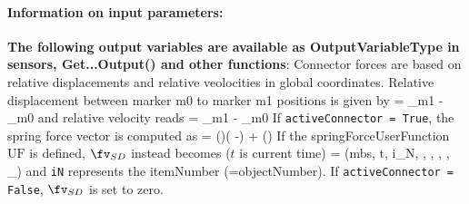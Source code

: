 \paragraph{Information on input parameters:} 
\finishTable
{\bf The following output variables are available as OutputVariableType in sensors, Get...Output() and other functions}: 
\finishTable
 \noindent
    \finishTable
    Connector forces are based on relative displacements and relative veolocities in global coordinates.
    Relative displacement between marker m0 to marker m1 positions is given by
    \be \label{eq_ObjectCartesianSpringDamper_deltaPos}
      \Delta\! = _{m1} - _{m0} \eqComma
    \ee
    and relative velocity reads
    \be
      \Delta\! = _{m1} - _{m0} \eqDot
    \ee
    If \texttt{activeConnector = True}, the spring force vector is computed as
    \be
       = \diag(\kv)\cdot(\Delta\! -) + \diag(\dv) \cdot \Delta\!  \eqDot
    \ee
    If the springForceUserFunction $\mathrm{UF}$ is defined, $\fv_{SD}$ instead becomes ($t$ is current time)
    \be
       = (mbs, t, i_N, \Delta\! , \Delta\! , \kv, \dv, \vv_{}) \eqComma
    \ee
    and \texttt{iN} represents the itemNumber (=objectNumber).
    If \texttt{activeConnector = False}, $\fv_{SD}$ is set to zero.

